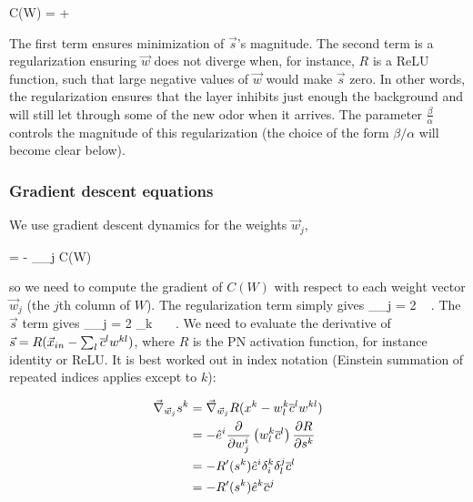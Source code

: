 \beq
	C(W) =   +  \frac{\beta}{\alpha} 
	\label{eq:cost_w}
\eeq

The first term ensures minimization of $\vec{s}$'s magnitude. The second term is a regularization ensuring $\vec{w}$ does not diverge when, for instance, $R$ is a ReLU function, such that large negative values of $\vec{w}$ would make $\vec{s}$ zero. In other words, the regularization ensures that the layer inhibits just enough the background and will still let through some of the new odor when it arrives. The parameter $\frac{\beta}{\alpha}$ controls the magnitude of this regularization (the choice of the form $\beta/\alpha$ will become clear below).

\subsubsection{Gradient descent equations}
\label{subsubsect:gradient_descent}
We use gradient descent dynamics for the weights $\vec{w}_j$, 

\beq
	 = - \alpha \vec{\nabla}_{_j} C(W)
	\label{eq:gradient_descent_w}
\eeq

so we need to compute the gradient of $C(W)$ with respect to each weight vector $\vec{w}_j$ (the $j$th column of $W$). The regularization term simply gives 
\beq
	\vec{\nabla}_{_j}  = 2    \,\,\, .
	\label{eq:gradient_regul}
\eeq
The $\vec{s}$ term gives 
\beq
	\vec{\nabla}_{_j}  = 2 \sum_k  \, \, \, .
	\label{eq:gradient_pn}
\eeq
We need to evaluate the derivative of $\vec{s} = R(\vec{x}_{in} - \sum_l \overline{c}^l w^{kl})$, where $R$ is the PN activation function, for instance identity or ReLU. It is best worked out in index notation (Einstein summation of repeated indices applies except to $k$):

\begin{align}
	\vec{\nabla}_{\vec{w}_j} s^k & = \vec{\nabla}_{\vec{w}_j} R(x^k - w^k_l \overline{c}^l w^{kl}) \nonumber \\
		&= - \hat{e}^i \frac{\partial}{\partial w^i_j} \left( w^k_l \overline{c}^l \right) \frac{\partial R}{\partial s^k} \nonumber \\
		&= - R'(s^k) \hat{e}^i \delta_i^k \delta_l^j \overline{c}^l \nonumber  \\
		&= -R'(s^k) \hat{e}^k \overline{c}^j     \label{eq:gradient_calculation}
\end{align}


